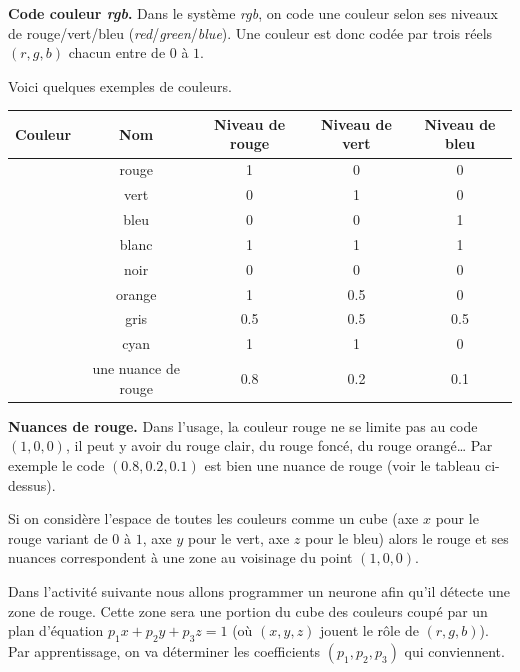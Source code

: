 \documentclass[11pt,class=report,crop=false]{standalone}
\begin{document}
\begin{cours}[Couleurs]
	
	
\textbf{Code couleur \emph{rgb}.}
Dans le système \emph{rgb}, on code une couleur selon ses niveaux de rouge/vert/bleu (\emph{red}/\emph{green}/\emph{blue}). Une couleur est donc codée par trois réels $(r,g,b)$ chacun entre de $0$ à $1$.


Voici quelques exemples de couleurs.

\begin{center}
	\begin{tabular}{|c|c|c|c|c|}
		\hline
		Couleur & Nom & Niveau de rouge & Niveau de vert & Niveau de bleu \\ \hline
		\cellcolor{red}  & rouge  & 1 & 0 & 0 \\ \hline
		\cellcolor{green}& vert  & 0 & 1 & 0 \\ \hline
		\cellcolor{blue} & bleu   & 0 & 0 & 1 \\ \hline
		\cellcolor{white} & blanc  & 1 & 1 & 1  \\ \hline
		\cellcolor{black} & noir   & 0 & 0 & 0  \\ \hline
		\cellcolor{myorange} & orange & 1 & 0.5 & 0  \\ \hline  
		\cellcolor{mygray}& gris   & 0.5 & 0.5 & 0.5 \\ \hline
		\cellcolor{mycyan}& cyan   & 1 & 1 & 0 \\ \hline
		\cellcolor{myred}& une nuance de rouge   & 0.8 & 0.2 & 0.1 \\ \hline
	\end{tabular}
\end{center}

\medskip

\textbf{Nuances de rouge.}
Dans l'usage, la couleur rouge ne se limite pas au code $(1,0,0)$, il peut y avoir du rouge clair, du rouge foncé, du rouge orangé\ldots{} Par exemple le code $(0.8,0.2,0.1)$ est bien une nuance de rouge (voir le tableau ci-dessus).

Si on considère l'espace de toutes les couleurs comme un cube (axe $x$ pour le rouge variant de $0$ à $1$, axe $y$ pour le vert, axe $z$ pour le bleu) alors le rouge et ses nuances correspondent à une zone au voisinage du point $(1,0,0)$.


Dans l'activité suivante nous allons programmer un neurone afin qu'il détecte une zone de rouge.
Cette zone sera une portion du cube des couleurs coupé par un plan d'équation $p_1 x+ p_2 y + p_3 z = 1$
(où $(x,y,z)$ jouent le rôle de $(r,g,b)$). Par apprentissage, on va déterminer les coefficients $(p_1,p_2,p_3)$ qui conviennent.



\end{cours}
\end{document}
